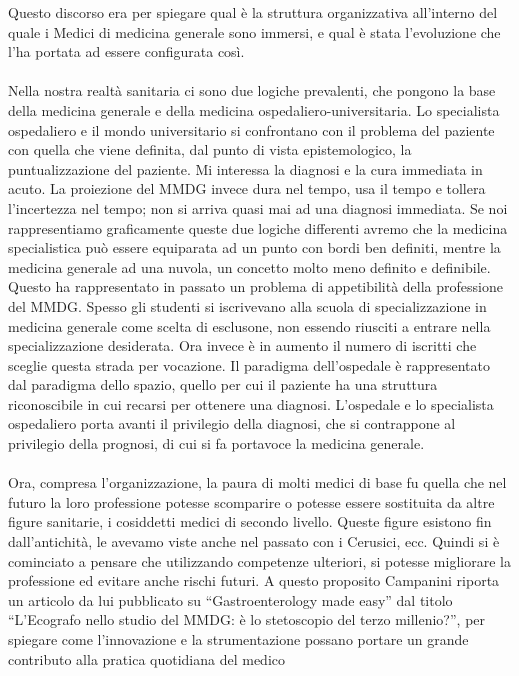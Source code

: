 Questo discorso era per spiegare qual è la struttura organizzativa
all'interno del quale i Medici di medicina generale sono immersi, e qual
è stata l'evoluzione che l'ha portata ad essere configurata così.
\\\\
Nella nostra realtà sanitaria ci sono due logiche prevalenti, che
pongono la base della medicina generale e della medicina
ospedaliero-universitaria. Lo specialista ospedaliero e il mondo
universitario si confrontano con il problema del paziente con quella che
viene definita, dal punto di vista epistemologico, la puntualizzazione
del paziente. Mi interessa la diagnosi e la cura immediata in acuto. La
proiezione del MMDG invece dura nel tempo, usa il tempo e tollera
l'incertezza nel tempo; non si arriva quasi mai ad una diagnosi
immediata. Se noi rappresentiamo graficamente queste due logiche
differenti avremo che la medicina specialistica può essere equiparata ad
un punto con bordi ben definiti, mentre la medicina generale ad una
nuvola, un concetto molto meno definito e definibile. Questo ha
rappresentato in passato un problema di appetibilità della professione
del MMDG. Spesso gli studenti si iscrivevano alla scuola di
specializzazione in medicina generale come scelta di esclusone, non
essendo riusciti a entrare nella specializzazione desiderata. Ora invece
è in aumento il numero di iscritti che sceglie questa strada per
vocazione. Il paradigma dell'ospedale è rappresentato dal paradigma
dello spazio, quello per cui il paziente ha una struttura riconoscibile
in cui recarsi per ottenere una diagnosi. L'ospedale e lo specialista
ospedaliero porta avanti il privilegio della diagnosi, che si
contrappone al privilegio della prognosi, di cui si fa portavoce la
medicina generale.
\\\\
Ora, compresa l'organizzazione, la paura di molti medici di base fu
quella che nel futuro la loro professione potesse scomparire o potesse
essere sostituita da altre figure sanitarie, i cosiddetti medici di
secondo livello. Queste figure esistono fin dall'antichità, le avevamo
viste anche nel passato con i Cerusici, ecc. Quindi si è cominciato a
pensare che utilizzando competenze ulteriori, si potesse migliorare la
professione ed evitare anche rischi futuri. A questo proposito Campanini
riporta un articolo da lui pubblicato su ``Gastroenterology made easy''
dal titolo ``L'Ecografo nello studio del MMDG: è lo stetoscopio del
terzo millenio?'', per spiegare come l'innovazione e la strumentazione
possano portare un grande contributo alla pratica quotidiana del medico
